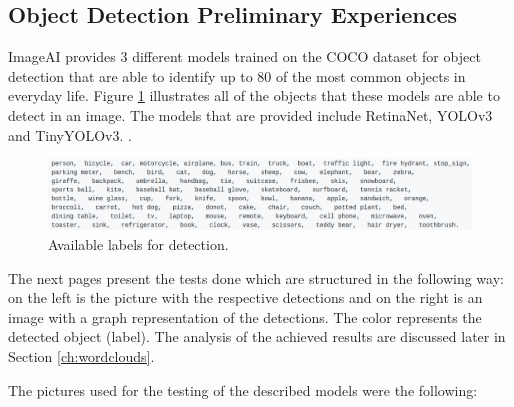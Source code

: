 
  \subsection{Object Detection Preliminary Experiences}
  \label{sec:object_test}

  ImageAI provides 3 different models trained on the COCO dataset for object detection that are able to identify up to 80 of the most common objects in everyday life. Figure \ref{fig:labels} illustrates all of the objects that these models are able to detect in an image. The models that are provided include RetinaNet, YOLOv3 and TinyYOLOv3. \cite{ImageAI}.
  

  

    \begin{figure}[H]
      \centering
      \includegraphics[width = \textwidth]{Sections/4InitialWork/4_images_random/detections.png}
      \caption{Available labels for detection. }
      \label{fig:labels} 
  \end{figure}

  The next pages present the tests done which are structured in the following way: on the left is the picture with the respective detections and on the right is an image with a graph representation of the detections. The color represents the detected object (label). The analysis of the achieved results are discussed later in Section \ref{ch:wordclouds}.

  The pictures used for the testing of the described models were the following:

